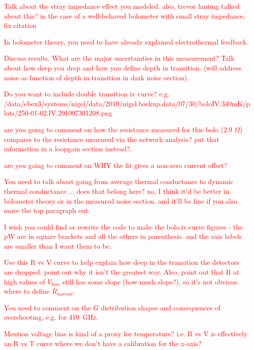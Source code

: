\textcolor{red}{Talk about the stray impedance effect you modeled. also, trevor lanting talked about this? in the case of a well-behaved bolometer with small stray impedance, \cite{lanting_thesis} \textcolor{red}{fix citation}}

\textcolor{red}{In bolometer theory, you need to have already explained electrothermal feedback.}

\textcolor{red}{Discuss results. What are the major uncertainties in this measurement? Talk about how deep you drop and how you define depth in transition. (will address noise as function of depth in transition in dark noise section).}

\textcolor{red}{Do you want to include double transition iv curve? e.g. /data/ebex3/systems/nigel/data/2010/nigel.backup.data/07/30/boloIV.340mK/plots/250-01-02.IV.201007301208.png}


\textcolor{red}{are you going to comment on how the resistance measured for this bolo (2.9 $\Omega$) compares to the resistance measured via the network analysis? put that information in a loopgain section instead?.}

\textcolor{red}{are you going to comment on WHY the fit gives a non-zero current offset?}

\textcolor{red}{You need to talk about going from average thermal conductance to dynamic thermal conductance ... does that belong here? no, I think it'd be better in bolometer theory or in the measured noise section. and it'll be fine if you also move the top paragraph out.}

 \textcolor{red}{I wish you could find or rewrite the code to make the bolo.iv.curve figures - the pW are in square brackets and all the others in parenthesis. and the axis labels are smaller than I want them to be.}


\textcolor{red}{Use this R vs V curve to help explain how deep in the transition the detectors are dropped. point out why it isn't the greatest way. Also, point out that R at high values of $V_{bias}$ still has some slope (how much slope?), so it's not obvious where to define $R_{normal}$. }

\textcolor{red}{You need to comment on the $\overline{G}$ distribution shapes and consequences of overshooting, e.g. for 410~GHz.}

\textcolor{red}{Mention voltage bias is kind of a proxy for temperature? i.e. R vs V is effectively an R vs T curve where we don't have a calibration for the x-axis?}

